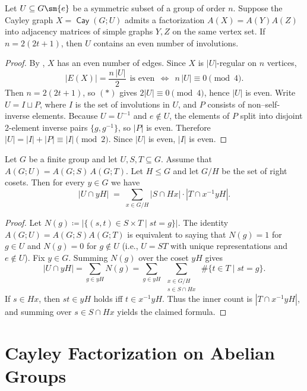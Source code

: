 \documentclass{file}
\newcommand{\cay}{\mathop{\mathsf{Cay}}}
\begin{document}
\begin{lem}
Let $U\subseteq G\sm\{e\}$ be a symmetric subset of a group of order $n$. 
Suppose the Cayley graph $X=\cay(G;U)$ admits a factorization $A(X)=A(Y)A(Z)$ into adjacency matrices of simple graphs $Y,Z$ on the same vertex set.
If $n=2(2t+1)$, then $U$ contains an even number of involutions.
\end{lem}

\begin{proof}
By , $X$ has an even number of edges. Since $X$ is $|U|$-regular on $n$ vertices,
\[
|E(X)|=\frac{n\,|U|}{2}\ \ \text{is even}\ \ \Longleftrightarrow\ \ n\,|U|\equiv 0 \pmod 4.
\tag{$\ast$}
\]
Then $n=2(2t+1)$, so $(\ast)$ gives $2|U|\equiv 0\pmod 4$, hence $|U|$ is even.
Write $U=I\sqcup P$, where $I$ is the set of involutions in $U$, and $P$ consists of
non–self-inverse elements. Because $U=U^{-1}$ and $e\notin U$, the elements of $P$ split into
disjoint 2-element inverse pairs $\{g,g^{-1}\}$, so $|P|$ is even. Therefore
$|U|=|I|+|P|\equiv |I|\pmod 2$. Since $|U|$ is even, $|I|$ is even.
\end{proof}



\begin{lem}\label{thm:transversal}
Let $G$ be a finite group and let $U,S,T\subseteq G$.
Assume that $A(G;U)=A(G;S)\,A(G;T)$.
Let $H\le G$ and let $G/H$ be the set of right cosets.
Then for every $y\in G$ we have
\[
|U\cap yH|
\;=\;
\sum_{x\in G/H} |S\cap Hx|\cdot |T\cap x^{-1}yH|.
\]
\end{lem}
\begin{proof}
Let $N(g)\coloneqq \bigl|\{(s,t)\in S\times T\mid  st=g\}\bigr|$.
The identity $A(G;U)=A(G;S)A(G;T)$ is equivalent to saying that
$N(g)=1$ for $g\in U$ and $N(g)=0$ for $g\notin U$ (i.e., $U=ST$ with
unique representations and $e\notin U$).
Fix $y\in G$. Summing $N(g)$ over the coset $yH$ gives
\[
|U\cap yH|=\sum_{g\in yH} N(g)
=\sum_{g\in yH}\ \sum_{\substack{x\in G/H\\ s\in S\cap Hx}}\ \#\{t\in T\mid  st=g\}.
\]
If $s\in Hx$, then $st\in yH$ holds iff $t\in x^{-1}yH$.
Thus the inner count is $|T\cap x^{-1}yH|$, and summing over $s\in S\cap Hx$
yields the claimed formula.
\end{proof}

\section{Cayley Factorization on Abelian Groups}
\end{document}
